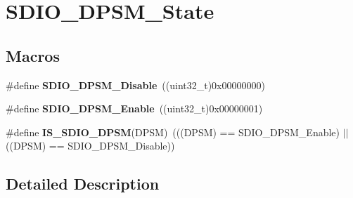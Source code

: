 \hypertarget{group___s_d_i_o___d_p_s_m___state}{\section{S\-D\-I\-O\-\_\-\-D\-P\-S\-M\-\_\-\-State}
\label{group___s_d_i_o___d_p_s_m___state}
}
\subsection*{Macros}
\begin{DoxyCompactItemize}
\item 
\hypertarget{group___s_d_i_o___d_p_s_m___state_ga156a9f6ab87a46dcb99ddd7462ca064b}{\#define {\bfseries S\-D\-I\-O\-\_\-\-D\-P\-S\-M\-\_\-\-Disable}~((uint32\-\_\-t)0x00000000)}\label{group___s_d_i_o___d_p_s_m___state_ga156a9f6ab87a46dcb99ddd7462ca064b}

\item 
\hypertarget{group___s_d_i_o___d_p_s_m___state_ga22bc12465c1cf839145619a859276c37}{\#define {\bfseries S\-D\-I\-O\-\_\-\-D\-P\-S\-M\-\_\-\-Enable}~((uint32\-\_\-t)0x00000001)}\label{group___s_d_i_o___d_p_s_m___state_ga22bc12465c1cf839145619a859276c37}

\item 
\hypertarget{group___s_d_i_o___d_p_s_m___state_gac87a2d7a8fc417a4514d733be50e6d63}{\#define {\bfseries I\-S\-\_\-\-S\-D\-I\-O\-\_\-\-D\-P\-S\-M}(D\-P\-S\-M)~(((D\-P\-S\-M) == S\-D\-I\-O\-\_\-\-D\-P\-S\-M\-\_\-\-Enable) $|$$|$ ((D\-P\-S\-M) == S\-D\-I\-O\-\_\-\-D\-P\-S\-M\-\_\-\-Disable))}\label{group___s_d_i_o___d_p_s_m___state_gac87a2d7a8fc417a4514d733be50e6d63}

\end{DoxyCompactItemize}


\subsection{Detailed Description}
